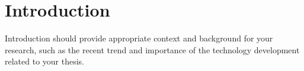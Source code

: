 \chapter{Introduction}
\label{chap:introduction}

Introduction should provide appropriate context and background for your research, such as the
recent trend and importance of the technology development related to your thesis.
